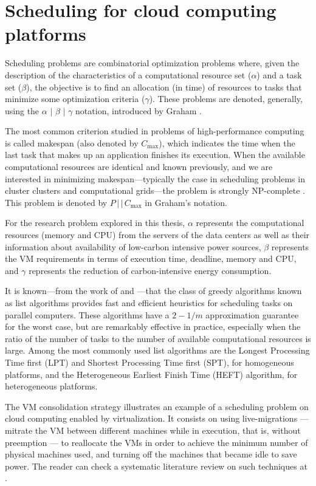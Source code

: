 \section{Scheduling for cloud computing platforms}
\label{sec:scheduling_cloud}

Scheduling problems are combinatorial optimization problems where, given the description of the characteristics of a computational resource set ($\alpha$) and a task set ($\beta$), the objective is to find an allocation (in time) of resources to tasks that minimize some optimization criteria ($\gamma$). These problems are denoted, generally, using the $\alpha$ $\vert$ $\beta$ $\vert$ $\gamma$ notation, introduced by Graham \citep{graham}. 

The most common criterion studied in problems of high-performance computing is called makespan (also denoted by $C_{\max}$), which indicates the time when the last task that makes up an application finishes its execution. When the available computational resources are identical and known previously, and we are interested in minimizing makespan---typically the case in scheduling problems in cluster clusters and computational grids---the problem is strongly NP-complete \citep{Garey}. This problem is denoted by $P\,\vert\,\vert\,C_{\max}$ in Graham's notation.

For the research problem explored in this thesis, $\alpha$ represents the computational resources (memory and CPU) from the servers of the data centers as well as their information about availability of low-carbon intensive power sources, $\beta$ represents the VM requirements in terms of execution time,  deadline, memory and CPU, and $\gamma$ represents the reduction of carbon-intensive energy consumption.

It is known---from the work of \citet {graham} and \citet {Garey}---that the class of greedy algorithms known as list algorithms provides fast and efficient heuristics for scheduling tasks on parallel computers. These algorithms have a $2 -1 /m$ approximation guarantee for the worst case, but are remarkably effective in practice, especially when the ratio of the number of tasks to the number of available computational resources is large. Among the most commonly used list algorithms are the Longest Processing Time first (LPT) and Shortest Processing Time first (SPT),  for homogeneous platforms, and the Heterogeneous Earliest Finish Time (HEFT) algorithm, for heterogeneous platforms.

The VM consolidation strategy illustrates an example of a scheduling problem on cloud computing enabled by virtualization. It consists on using live-migrations --- mitrate the VM between different machines while in execution, that is, without preemption --- to reallocate the VMs in order to achieve the minimum number of physical machines used, and turning off the machines that became idle to save power. The reader can check a systematic literature review on such techniques at \cite{10.1145/3470972}.


